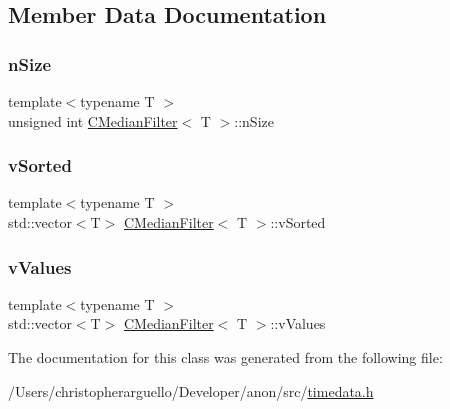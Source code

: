 \subsection{Member Data Documentation}
\mbox{\label{class_c_median_filter_a65ac3eedb12b1f782d1237dceefa8a4c}} 
\subsubsection{\texorpdfstring{n\+Size}{nSize}}
{\footnotesize\ttfamily template$<$typename T $>$ \\
unsigned int \mbox{\hyperlink{class_c_median_filter}{C\+Median\+Filter}}$<$ T $>$\+::n\+Size\hspace{0.3cm}{\ttfamily [private]}}

\mbox{\label{class_c_median_filter_a8290248907e4c1e89db51abb107b83a9}} 
\subsubsection{\texorpdfstring{v\+Sorted}{vSorted}}
{\footnotesize\ttfamily template$<$typename T $>$ \\
std\+::vector$<$T$>$ \mbox{\hyperlink{class_c_median_filter}{C\+Median\+Filter}}$<$ T $>$\+::v\+Sorted\hspace{0.3cm}{\ttfamily [private]}}

\mbox{\label{class_c_median_filter_ae20afe1640996de11db4e97f4c3103fa}} 
\subsubsection{\texorpdfstring{v\+Values}{vValues}}
{\footnotesize\ttfamily template$<$typename T $>$ \\
std\+::vector$<$T$>$ \mbox{\hyperlink{class_c_median_filter}{C\+Median\+Filter}}$<$ T $>$\+::v\+Values\hspace{0.3cm}{\ttfamily [private]}}



The documentation for this class was generated from the following file\+:\begin{DoxyCompactItemize}
\item 
/\+Users/christopherarguello/\+Developer/anon/src/\mbox{\hyperlink{timedata_8h}{timedata.\+h}}\end{DoxyCompactItemize}
